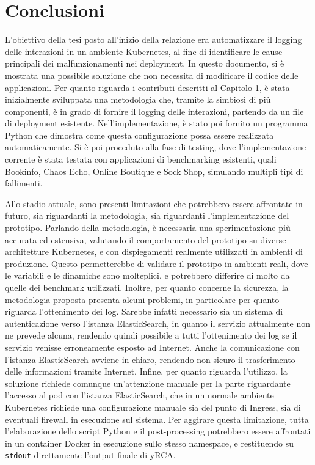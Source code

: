 \chapter{Conclusioni}
L'obiettivo della tesi posto all'inizio della relazione era automatizzare il logging delle interazioni in un ambiente Kubernetes, al fine di identificare le cause principali dei malfunzionamenti nei deployment. In questo documento, si è mostrata una possibile soluzione che non necessita di modificare il codice delle applicazioni. Per quanto riguarda i contributi descritti al Capitolo 1, è stata inizialmente sviluppata una metodologia che, tramite la simbiosi di più componenti, è in grado di fornire il logging delle interazioni, partendo da un file di deployment esistente. Nell'implementazione, è stato poi fornito un programma Python che dimostra come questa configurazione possa essere realizzata automaticamente. Si è poi proceduto alla fase di testing, dove l'implementazione corrente è stata testata con applicazioni di benchmarking esistenti, quali Bookinfo, Chaos Echo, Online Boutique e Sock Shop, simulando multipli tipi di fallimenti.

Allo stadio attuale, sono presenti limitazioni che potrebbero essere affrontate in futuro, sia riguardanti la metodologia, sia riguardanti l'implementazione del prototipo. Parlando della metodologia, è necessaria una sperimentazione più accurata ed estensiva, valutando il comportamento del prototipo su diverse architetture Kubernetes, e con dispiegamenti realmente utilizzati in ambienti di produzione. Questo permetterebbe di validare il prototipo in ambienti reali, dove le variabili e le dinamiche sono molteplici, e potrebbero differire di molto da quelle dei benchmark utilizzati. Inoltre, per quanto concerne la sicurezza, la metodologia proposta presenta alcuni problemi, in particolare per quanto riguarda l'ottenimento dei log. Sarebbe infatti necessario sia un sistema di autenticazione verso l'istanza ElasticSearch, in quanto il servizio attualmente non ne prevede alcuna, rendendo quindi possibile a tutti l'ottenimento dei log se il servizio venisse erroneamente esposto ad Internet. Anche la comunicazione con l'istanza ElasticSearch avviene in chiaro, rendendo non sicuro il trasferimento delle informazioni tramite Internet. Infine, per quanto riguarda l'utilizzo, la soluzione richiede comunque un'attenzione manuale per la parte riguardante l'accesso al pod con l'istanza ElasticSearch, che in un normale ambiente Kubernetes richiede una configurazione manuale sia del punto di Ingress, sia di eventuali firewall in esecuzione sul sistema. Per aggirare questa limitazione, tutta l'elaborazione dello script Python e il post-processing potrebbero essere affrontati in un container Docker in esecuzione sullo stesso namespace, e restituendo su \verb|stdout| direttamente l'output finale di yRCA.

